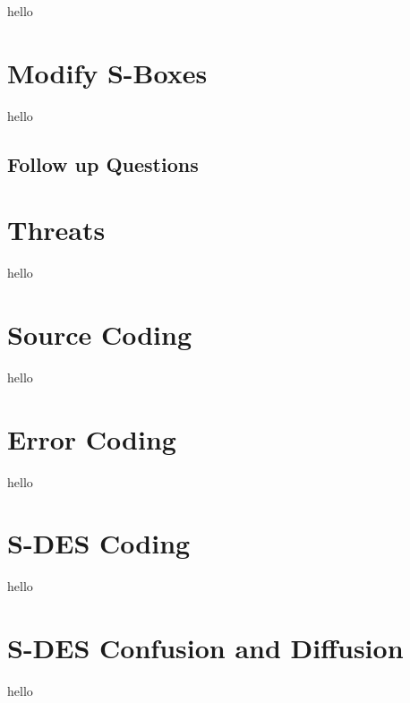 \documentclass[]{article}
\begin{document}
hello

\section*{Modify S-Boxes}

hello

\break

\vspace*{-0.8cm}
\begin{center}
	\section*{Follow up Questions}
\end{center}

\vspace*{0.8cm}
\section*{Threats}

hello \\

\section*{Source Coding}

hello \\

\section*{Error Coding}

hello \\

\section*{S-DES Coding}

hello \\

\section*{S-DES Confusion and Diffusion}

hello \\

\break

\end{document}
